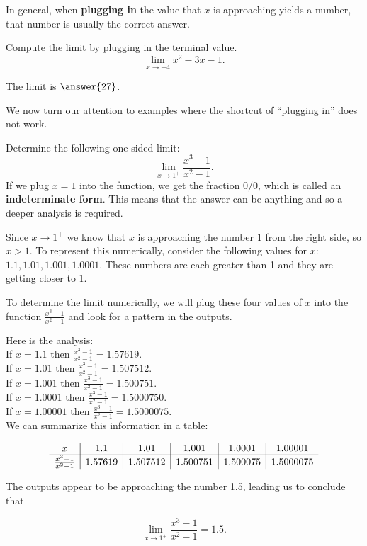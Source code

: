 \documentclass{ximera}
\begin{document}
In general, when \textbf{plugging in} the value that $x$ is approaching yields a number, 
that number is usually the correct answer.  



\begin{problem}[problem 1]
Compute the limit by plugging in the terminal value.
\[
\lim_{x \to -4} x^2 -3x -1.
\]

The limit is $\answer{27}$.
\end{problem}

We now turn our attention to examples where the shortcut of ``plugging in'' does not work.

\begin{example}[example 2]
Determine the following one-sided limit: 
\[\lim_{x \to 1^{+}} \frac{x^3 - 1}{x^2 -1}.\]
If we plug $x = 1$ into the function, we get the fraction  $0/0$, which is called an \textbf{indeterminate form}. 
This means that the answer can be anything and so a deeper analysis is required.


Since  $x \to 1^{+}$ we know that $x$ is approaching the number $1$ from the right side, so $x > 1$. 
To represent this numerically, consider the following values for $x$: $1.1, 1.01, 1.001, 1.0001$.
These numbers are each greater than 1 and they are getting closer to 1.
 
To determine the limit numerically,  we will plug these four values of $x$ into the function $\frac{x^3 - 1}{x^2-1}$ and  
look for a pattern in the outputs.

Here is the analysis:\\
If $x = 1.1$ then $\frac{x^3 - 1}{x^2-1}= 1.57619$.\\
If $x = 1.01$ then $\frac{x^3 - 1}{x^2-1} = 1.507512$.\\
If $x = 1.001$ then $\frac{x^3 - 1}{x^2-1}= 1.500751$.\\
If $x = 1.0001$ then $\frac{x^3 - 1}{x^2-1}= 1.5000750$.\\
If $x = 1.00001$ then $\frac{x^3 - 1}{x^2-1}= 1.5000075$.\\

We can summarize this information in a table:
  
\[
\begin{array}{ c | c | c | c | c | c}
  x & 1.1 & 1.01 & 1.001 & 1.0001 & 1.00001\\ 
	\hline
	\frac{x^3 - 1}{x^2-1} & 1.57619 & 1.507512 & 1.500751 & 1.500075 & 1.5000075
\end{array}
\]


The outputs appear to be approaching the number 1.5, leading us to conclude that

\[\lim_{x \to 1^+} \frac{x^3 - 1}{x^2-1} = 1.5.\] 
 
 
\end{example}
\end{document}
